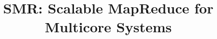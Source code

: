\documentclass[preprint,10pt]{sigplanconf}
\title{\vspace{-5pt} SMR: Scalable MapReduce for Multicore Systems\\
  
	\vspace{-5pt}}
\begin{document}
\maketitle


%








\begin{small}


%
\end{small}
\end{document}
